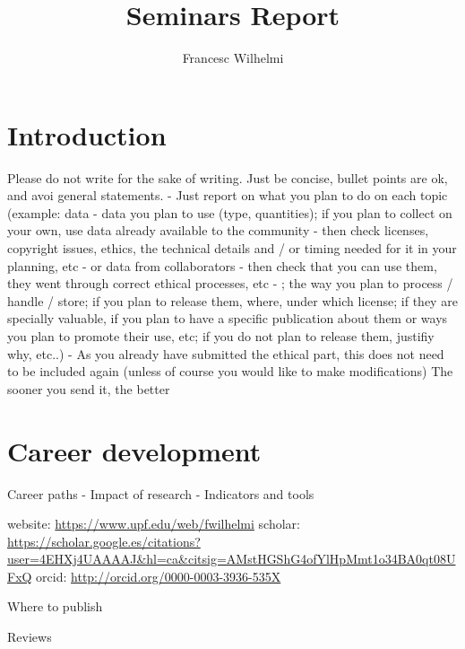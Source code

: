 \documentclass[12pt, a4paper,twoside]{article}
\title{Seminars Report}
\author{Francesc Wilhelmi}
\begin{document}
	\maketitle
	
	
	\section{Introduction}
	\label{section:introduction}	
	
		Please do not write for the sake of writing. Just be concise, bullet points are ok, and avoi general statements. - Just report on what you plan to do on each topic (example: data - data you plan to use (type, quantities); if you plan to collect on your own, use data already available to the community - then check licenses, copyright issues, ethics, the technical details and / or timing needed for it in your planning, etc - or data from collaborators - then check that you can use them, they went through correct ethical processes, etc - ; the way you plan to process / handle / store; if you plan to release them, where, under which license; if they are specially valuable, if you plan to have a specific publication about them or ways you plan to promote their use, etc; if you do not plan to release them, justifiy why, etc..) - As you already have submitted the ethical part, this does not need to be included again (unless of course you would like to make modifications) The sooner you send it, the better 
		
	\section{Career development}
	\label{section:career}
	Career paths - Impact of research - Indicators and tools 
	
	website: \url{https://www.upf.edu/web/fwilhelmi}
	scholar: \url{https://scholar.google.es/citations?user=4EHXj4UAAAAJ&hl=ca&citsig=AMstHGShG4ofYlHpMmt1o34BA0qt08UFxQ}
	orcid: \url{http://orcid.org/0000-0003-3936-535X}
		
	Where to publish
	
	Reviews
	
\end{document}
